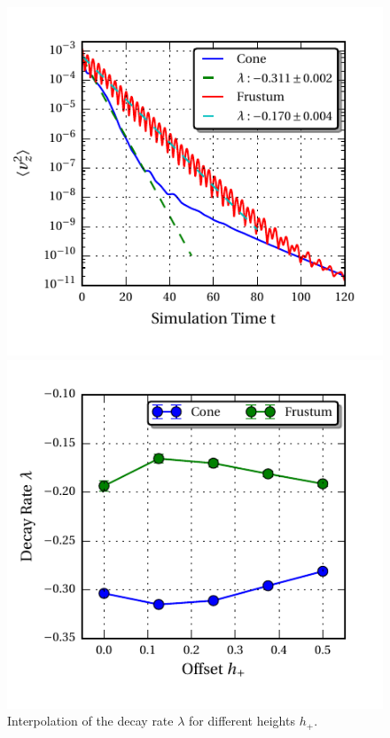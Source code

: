 \begin{figure}[!b]
\centering
\begin{minipage}{.45\textwidth}
  \centering
  \includegraphics{gfx/cone/final/decay/decay_example.pdf}
  \caption{
      \label{fig:cone:finaldecayexample}
      Decay of the M\RN{1} peak in the frustum in comparison to the cone.
    }
\end{minipage}%
\hfill
\begin{minipage}{.45\textwidth}
  \centering
  \includegraphics{gfx/cone/final/decay/fit_decay.pdf}
  \caption{
      \label{fig:cone:finaldecayfit}
      Interpolation of the decay rate $\lambda$ for different heights $h_+$.
    }
\end{minipage}
\end{figure}

